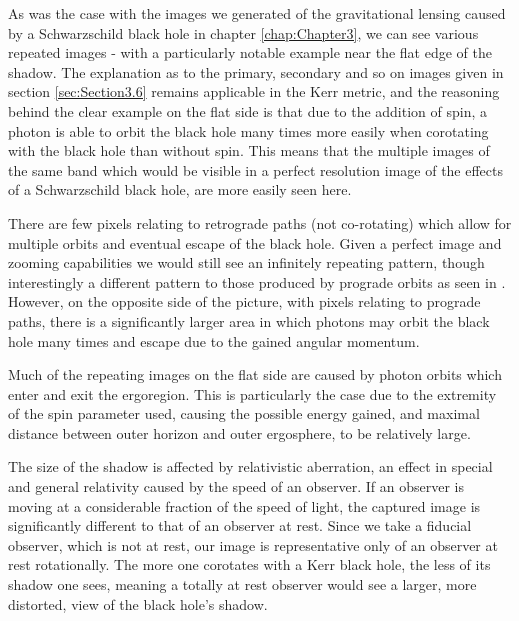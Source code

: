 \documentclass[oneside,openright,frontopenright, singlespacing]{dmathesis}
\begin{document}
\vspace{1em}
	As was the case with the images we generated of the gravitational lensing caused by a Schwarzschild black hole in chapter \ref{chap:Chapter3}, we can see various repeated images - with a particularly notable example near the flat edge of the shadow. The explanation as to the primary, secondary and so on images given in section \ref{sec:Section3.6} remains applicable in the Kerr metric, and the reasoning behind the clear example on the flat side is that due to the addition of spin, a photon is able to orbit the black hole many times more easily when corotating with the black hole than without spin. This means that the multiple images of the same band which would be visible in a perfect resolution image of the effects of a Schwarzschild black hole, are more easily seen here. 

\vspace{1em}
	There are few pixels relating to retrograde paths (not co-rotating) which allow for multiple orbits and eventual escape of the black hole. Given a perfect image and zooming capabilities we would still see an infinitely repeating pattern, though interestingly a different pattern to those produced by prograde orbits as seen in \cite[pp. 8-11]{seeingRelativity}. However, on the opposite side of the picture, with pixels relating to prograde paths, there is a significantly larger area in which photons may orbit the black hole many times and escape due to the gained angular momentum.

\vspace{1em}
	Much of the repeating images on the flat side are caused by photon orbits which enter and exit the ergoregion. This is particularly the case due to the extremity of the spin parameter used, causing the possible energy gained, and maximal distance between outer horizon and outer ergosphere, to be relatively large.

\vspace{1em}
	The size of the shadow is affected by relativistic aberration, an effect in special and general relativity caused by the speed of an observer. If an observer is moving at a considerable fraction of the speed of light, the captured image is significantly different to that of an observer at rest. Since we take a fiducial observer, which is not at rest, our image is representative only of an observer at rest rotationally. The more one corotates with a Kerr black hole, the less of its shadow one sees, meaning a totally at rest observer would see a larger, more distorted, view of the black hole's shadow.
\end{document}
